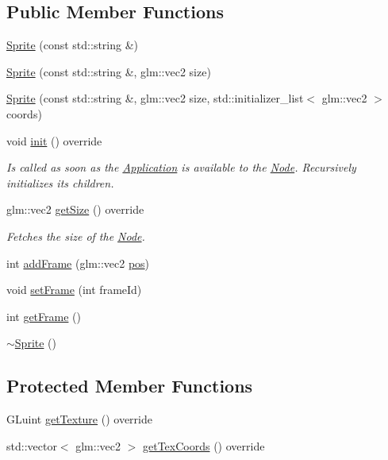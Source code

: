 \subsection*{Public Member Functions}
\begin{DoxyCompactItemize}
\item 
\mbox{\hyperlink{classsage_1_1Sprite_abae47a15ec83a91f3b714db14f2a492b}{Sprite}} (const std\+::string \&)
\item 
\mbox{\hyperlink{classsage_1_1Sprite_a76a269d903de2837314b42c3d43f0df2}{Sprite}} (const std\+::string \&, glm\+::vec2 size)
\item 
\mbox{\hyperlink{classsage_1_1Sprite_a4ed2be3fab0b4869728be4f91cb67169}{Sprite}} (const std\+::string \&, glm\+::vec2 size, std\+::initializer\+\_\+list$<$ glm\+::vec2 $>$ coords)
\item 
void \mbox{\hyperlink{classsage_1_1Sprite_aeaf5c7aa5aeff1b0a4da9e66430f1c42}{init}} () override
\begin{DoxyCompactList}\small\item\em Is called as soon as the \mbox{\hyperlink{classsage_1_1Application}{Application}} is available to the \mbox{\hyperlink{classsage_1_1Node}{Node}}. Recursively initializes its children. \end{DoxyCompactList}\item 
glm\+::vec2 \mbox{\hyperlink{classsage_1_1Sprite_ab6c3b12b45eeafab8e816207158121a1}{get\+Size}} () override
\begin{DoxyCompactList}\small\item\em Fetches the size of the \mbox{\hyperlink{classsage_1_1Node}{Node}}. \end{DoxyCompactList}\item 
int \mbox{\hyperlink{classsage_1_1Sprite_a7444391256eab0cf1b7a994885026352}{add\+Frame}} (glm\+::vec2 \mbox{\hyperlink{classsage_1_1Node_a7e0ae6eeb84fae60e54e6685c982b0b2}{pos}})
\item 
void \mbox{\hyperlink{classsage_1_1Sprite_ada2cb241cf1fc71378372d04f19926e2}{set\+Frame}} (int frame\+Id)
\item 
int \mbox{\hyperlink{classsage_1_1Sprite_af7d9465b0ef867d23cbb587b6c7b6b13}{get\+Frame}} ()
\item 
\mbox{\hyperlink{classsage_1_1Sprite_a8accab430f9d90ae5117b57d67e32b84}{$\sim$\+Sprite}} ()
\end{DoxyCompactItemize}
\subsection*{Protected Member Functions}
\begin{DoxyCompactItemize}
\item 
G\+Luint \mbox{\hyperlink{classsage_1_1Sprite_aa75f3595b809f99847a9642ce2bf319a}{get\+Texture}} () override
\item 
std\+::vector$<$ glm\+::vec2 $>$ \mbox{\hyperlink{classsage_1_1Sprite_a3e5acc98484d2f326fdd1ff622cfd2ff}{get\+Tex\+Coords}} () override
\end{DoxyCompactItemize}
